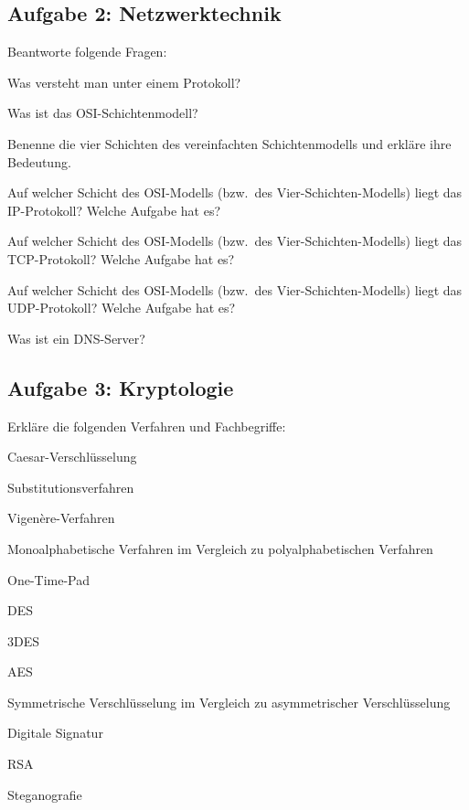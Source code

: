 \subsection{Aufgabe 2: Netzwerktechnik}

Beantworte folgende Fragen:

\begin{compactenum}
\item Was versteht man unter einem Protokoll?
\item Was ist das OSI-Schichtenmodell?
\item Benenne die vier Schichten des vereinfachten Schichtenmodells und erkläre
ihre Bedeutung.
\item Auf welcher Schicht des OSI-Modells (bzw.\ des Vier-Schichten-Modells)
liegt das IP-Protokoll? Welche Aufgabe hat es?
\item Auf welcher Schicht des OSI-Modells (bzw.\ des Vier-Schichten-Modells)
liegt das TCP-Protokoll? Welche Aufgabe hat es?
\item Auf welcher Schicht des OSI-Modells (bzw.\ des Vier-Schichten-Modells)
liegt das UDP-Protokoll? Welche Aufgabe hat es?
\item Was ist ein DNS-Server?
\end{compactenum}

\subsection{Aufgabe 3: Kryptologie}

Erkläre die folgenden Verfahren und Fachbegriffe:

\begin{compactenum}
\item Caesar-Verschlüsselung
\item Substitutionsverfahren
\item Vigenère-Verfahren
\item Monoalphabetische Verfahren im Vergleich zu polyalphabetischen Verfahren
\item One-Time-Pad
\item DES
\item 3DES
\item AES
\item Symmetrische Verschlüsselung im Vergleich zu asymmetrischer
Verschlüsselung
\item Digitale Signatur
\item RSA
\item Steganografie
\end{compactenum}


